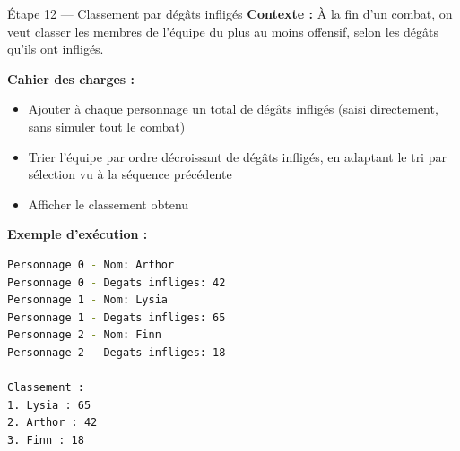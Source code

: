 \begin{UPSTIManipulation}{Étape 12 — Classement par dégâts infligés}
  \textbf{Contexte :} À la fin d'un combat, on veut classer les membres de l'équipe du plus au
  moins offensif, selon les dégâts qu'ils ont infligés.

  \textbf{Cahier des charges :}
  \begin{itemize}
    \item Ajouter à chaque personnage un total de dégâts infligés (saisi directement, sans
      simuler tout le combat)
    \item Trier l'équipe par ordre décroissant de dégâts infligés, en adaptant le tri par
      sélection vu à la séquence précédente
    \item Afficher le classement obtenu
  \end{itemize}

  \textbf{Exemple d'exécution :}
  \begin{lstlisting}[language=bash]
Personnage 0 - Nom: Arthor
Personnage 0 - Degats infliges: 42
Personnage 1 - Nom: Lysia
Personnage 1 - Degats infliges: 65
Personnage 2 - Nom: Finn
Personnage 2 - Degats infliges: 18

Classement :
1. Lysia : 65
2. Arthor : 42
3. Finn : 18
  \end{lstlisting}

\end{UPSTIManipulation}
